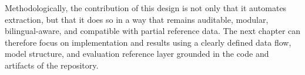 \documentclass[english, online, cse, master]{dithesis}
\begin{document}
Methodologically, the contribution of this design is not only that it automates extraction, but that it does so in a way that remains auditable, modular, bilingual-aware, and compatible with partial reference data. The next chapter can therefore focus on implementation and results using a clearly defined data flow, model structure, and evaluation reference layer grounded in the code and artifacts of the repository.
\end{document}
